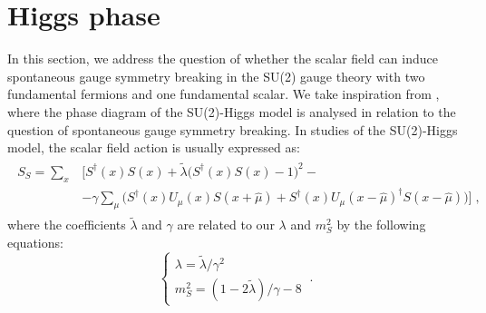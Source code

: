 \section{Higgs phase}

In this section, we address the question of whether the scalar field can induce spontaneous gauge symmetry breaking in the SU(2) gauge theory with two fundamental fermions and one fundamental scalar. We take inspiration from \cite{Caudy:2007sf}, where the phase diagram of the SU(2)-Higgs model is analysed in relation to the question of spontaneous gauge symmetry breaking. In studies of the SU(2)-Higgs model, the scalar field action is usually expressed as:
\begin{eqnarray}
\begin{split}
  S_S =  \sum_x &\biggl[ S^{\dagger}(x) S(x) + \tilde \lambda \bigl( S^{\dagger}(x) S(x) - 1 \bigr)^2 - \\ 
 &- \gamma\sum_{\mu}   \biggl( S^{\dagger}(x) U_{\mu}(x) S(x+\hat\mu) +  S^{\dagger}(x) U_{\mu}(x-\hat\mu)^{\dagger} S(x-\hat\mu)\biggr)  \biggr]\; ,
\end{split}
\end{eqnarray}
%
where the coefficients $\tilde \lambda$ and $\gamma$ are related to our $\lambda$ and $m_S^2$ by the following equations:
\begin{equation}
\begin{cases}
\lambda = \tilde \lambda/\gamma^2\\
m_S^2 = (1-2\tilde\lambda)/\gamma - 8 
\end{cases} \: .
\end{equation}
%
